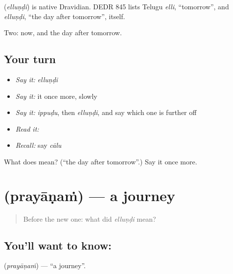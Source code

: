 \begin{cousinweb}
\textbf{} (\emph{elluṇḍi}) is native Dravidian. DEDR 845 lists Telugu \emph{elli}, \textquotedblleft{}tomorrow\textquotedblright{}, and \emph{elluṇḍi}, \textquotedblleft{}the day after tomorrow\textquotedblright{}, itself.
\end{cousinweb}

\begin{grammarlens}[title={What you've built}]
Two: now, and the day after tomorrow.
\end{grammarlens}

\subsection*{Your turn}
\begin{itemize}
\raggedright
  \item \emph{Say it:} \emph{elluṇḍi}
  \item \emph{Say it:} it once more, slowly
  \item \emph{Say it:} \emph{ippuḍu}, then \emph{elluṇḍi}, and say which one is further off
  \item \emph{Read it:} \textbf{}
  \item \emph{Recall:} say \emph{cālu}
\end{itemize}

\begin{tcolorbox}[breakable,colback=teal!4,colframe=teal!35!black,title={Before you move on}]
What does  mean? (\textquotedblleft{}the day after tomorrow\textquotedblright{}.) Say it once more.
\end{tcolorbox}
\section[\texorpdfstring{\te{ప్రయాణం} (prayāṇaṁ)}{ప్రయాణం (prayāṇaṁ)}]{ (prayāṇaṁ) — a journey}

\label{lesson:TE-C50-journey}



\begin{quote}
Before the new one: what did \emph{elluṇḍi} mean?
\end{quote}

\subsection*{You'll want to know: }
\textbf{} (\emph{prayāṇaṁ}) — \textquotedblleft{}a journey\textquotedblright{}.

